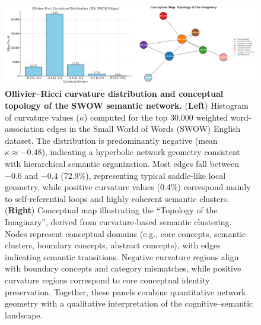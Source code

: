 \documentclass[fleqn,10pt]{wlscirep}
\begin{document}
\begin{figure}[H]
    \centering
    \includegraphics[width=\textwidth]{figure2_orc_distribution_and_concept_map_en.png}
    \caption{\textbf{Ollivier--Ricci curvature distribution and conceptual topology of the SWOW semantic network.} 
    (\textbf{Left}) Histogram of curvature values ($\kappa$) computed for the top 30,000 weighted word-association edges in the Small World of Words (SWOW) English dataset. 
    The distribution is predominantly negative (mean $\kappa \approx -0.48$), indicating a hyperbolic network geometry consistent with hierarchical semantic organization. 
    Most edges fall between $-0.6$ and $-0.4$ (72.9\%), representing typical saddle-like local geometry, while positive curvature values (0.4\%) correspond mainly to self-referential loops and highly coherent semantic clusters. 
    (\textbf{Right}) Conceptual map illustrating the ``Topology of the Imaginary'', derived from curvature-based semantic clustering. 
    Nodes represent conceptual domains (e.g., core concepts, semantic clusters, boundary concepts, abstract concepts), with edges indicating semantic transitions. 
    Negative curvature regions align with boundary concepts and category mismatches, while positive curvature regions correspond to core conceptual identity preservation. 
    Together, these panels combine quantitative network geometry with a qualitative interpretation of the cognitive--semantic landscape.}
    \label{fig:orc_distribution_concept_map}
\end{figure}
\end{document}

